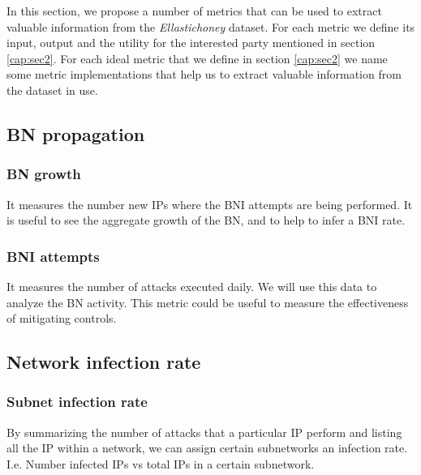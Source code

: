 


In this section, we propose a number of metrics that can be used to extract valuable information from the \textit{Ellastichoney} dataset. For each metric we define its input, output and the utility for the interested party mentioned in section \ref{cap:sec2}. For each ideal metric that we define in section \ref{cap:sec2} we name some metric implementations that help us to extract valuable information from the dataset in use.
\indent
\subsection{BN propagation}

    \subsubsection{BN growth}It measures the number new IPs where the BNI attempts are being performed. It is useful to see the aggregate growth of the BN, and to help to infer a BNI rate.

    \subsubsection{BNI attempts}
    It measures the number of attacks executed daily. We will use this data to analyze the BN activity. This metric could be useful to measure the effectiveness of mitigating controls.

\subsection{Network infection rate}
    \subsubsection{Subnet infection rate} By summarizing the number of attacks that a particular IP perform and listing all the IP within a network, we can assign certain subnetworks an infection rate. I.e. Number infected IPs vs total IPs in a certain subnetwork.


